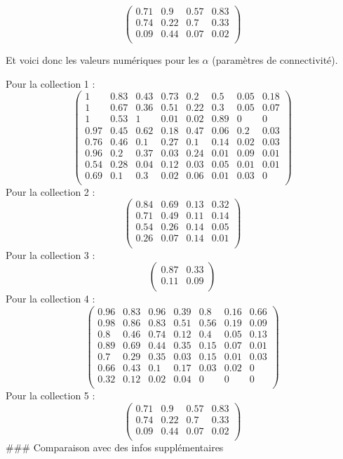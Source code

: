 \normalsize\newline\[\begin{pmatrix} 0.71 &0.9 &0.57 &0.83 \\0.74 &0.22 &0.7 &0.33 \\0.09 &0.44 &0.07 &0.02 \\ \end{pmatrix}\]

Et voici donc les valeurs numériques pour les \(\alpha\) (paramètres de
connectivité).

Pour la collection 1 :
\[\begin{pmatrix} 1 &0.83 &0.43 &0.73 &0.2 &0.5 &0.05 &0.18 \\1 &0.67 &0.36 &0.51 &0.22 &0.3 &0.05 &0.07 \\1 &0.53 &1 &0.01 &0.02 &0.89 &0 &0 \\0.97 &0.45 &0.62 &0.18 &0.47 &0.06 &0.2 &0.03 \\0.76 &0.46 &0.1 &0.27 &0.1 &0.14 &0.02 &0.03 \\0.96 &0.2 &0.37 &0.03 &0.24 &0.01 &0.09 &0.01 \\0.54 &0.28 &0.04 &0.12 &0.03 &0.05 &0.01 &0.01 \\0.69 &0.1 &0.3 &0.02 &0.06 &0.01 &0.03 &0 \\ \end{pmatrix}\]
Pour la collection 2 :
\[\begin{pmatrix} 0.84 &0.69 &0.13 &0.32 \\0.71 &0.49 &0.11 &0.14 \\0.54 &0.26 &0.14 &0.05 \\0.26 &0.07 &0.14 &0.01 \\ \end{pmatrix}\]
Pour la collection 3 :
\[\begin{pmatrix} 0.87 &0.33 \\0.11 &0.09 \\ \end{pmatrix}\] Pour la
collection 4 :
\[\begin{pmatrix} 0.96 &0.83 &0.96 &0.39 &0.8 &0.16 &0.66 \\0.98 &0.86 &0.83 &0.51 &0.56 &0.19 &0.09 \\0.8 &0.46 &0.74 &0.12 &0.4 &0.05 &0.13 \\0.89 &0.69 &0.44 &0.35 &0.15 &0.07 &0.01 \\0.7 &0.29 &0.35 &0.03 &0.15 &0.01 &0.03 \\0.66 &0.43 &0.1 &0.17 &0.03 &0.02 &0 \\0.32 &0.12 &0.02 &0.04 &0 &0 &0 \\ \end{pmatrix}\]
Pour la collection 5 :
\[\begin{pmatrix} 0.71 &0.9 &0.57 &0.83 \\0.74 &0.22 &0.7 &0.33 \\0.09 &0.44 &0.07 &0.02 \\ \end{pmatrix}\]
\#\#\# Comparaison avec des infos supplémentaires

